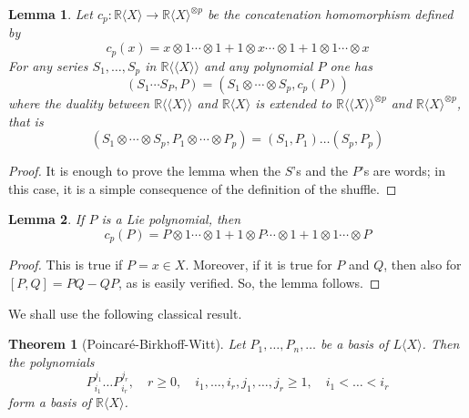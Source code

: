 \documentclass[a4paper,12pt]{article}
\newtheorem*{theorem*}{Theorem}
\newtheorem{lemma}{Lemma}
\newcommand{\R}{\mathbb{R}}
\newcommand{\Rx}{\R\langle X\rangle}
\newcommand{\Lx}{L\langle X\rangle}
\newcommand{\Rxx}{\R\langle\langle X\rangle\rangle}
\begin{document}
\begin{lemma} \label{l:1}
	Let $c_p: \Rx \to \Rx^{\otimes p}$ be the concatenation homomorphism defined by
	\begin{equation*}
		c_p(x)= x \otimes 1 \dotsb \otimes 1 + 1 \otimes x \dotsb \otimes 1 + 1 \otimes 1 \dotsb \otimes x
	\end{equation*}
	For any series $S_1, \ldots, S_p$ in $\Rxx$ and any polynomial $P$ one has
	\begin{equation*}
		\left({S}_1 \dotsb {S}_{{P}}, {P}\right)=\left({S}_1 \otimes \dotsb \otimes {S}_{{p}}, {c}_{{p}}({P})\right)
	\end{equation*}
	where the duality between $\Rxx$ and $\Rx$ is extended to $\Rxx^{\otimes p}$ and $\Rx^{\otimes p}$, that is
	\begin{equation*}
		\left(S_1 \otimes \dotsb \otimes S_p, {P}_1 \otimes \dotsb \otimes {P}_{{p}}\right)=\left(S_1, {P}_1\right) \ldots\left(S_p, P_p\right)
	\end{equation*}
\end{lemma}

\begin{proof}
	It is enough to prove the lemma when the $S$'s and the $P$'s are words; in this case, it is a simple consequence of the definition of the shuffle.
\end{proof}


\begin{lemma} \label{l:2}
	If $P$ is a Lie polynomial, then
	\begin{equation*}
		c_p(P) = P \otimes 1 \dotsb \otimes 1 + 1 \otimes P \dotsb \otimes 1 + 1 \otimes 1 \dotsb \otimes P
	\end{equation*}
\end{lemma}

\begin{proof}
	This is true if $P=x \in X$. Moreover, if it is true for $P$ and $Q$, then also for $[P, Q]=P Q-Q P$, as is easily verified. So, the lemma follows.
\end{proof}

We shall use the following classical result.

\begin{theorem*}[Poincaré-Birkhoff-Witt]
	Let $P_1, \ldots, P_n, \ldots$ be a basis of $\Lx$. Then the polynomials
	\begin{equation*}
		P_{i_1}^{j_1} \ldots P_{i_r}^{j_r}, 
		\quad r \geq 0, \quad i_1, \ldots, i_r, j_1, \ldots, j_r \geq 1, 
		\quad i_1<\ldots < i_r
	\end{equation*}
	form a basis of $\Rx$.
\end{theorem*}
\end{document}
